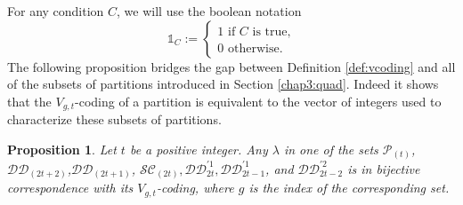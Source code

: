 \documentclass[11pt,letterpaper]{amsart}
\def\ccsc{\mathcal {SC}}
\def\ccdd{\mathcal {DD}}
\def\ccp{\mathcal P}
\newtheorem{prop}[df]{Proposition}		%
\numberwithin{equation}{section}
\numberwithin{df}{section}
\begin{document}
For any condition $C$, we will use the boolean notation
$$\mathds{1}_C:=\begin{cases}
1 \text{ if } C\text{ is true,}\\
0 \text{ otherwise.}\end{cases}$$
The following proposition bridges the gap between Definition \ref{def:vcoding} and all of the subsets of partitions introduced in Section \ref{chap3:quad}. Indeed it shows that the $V_{g,t}$-coding of a partition is equivalent to the vector of integers used to characterize these subsets of partitions.
\begin{prop}\label{prop:core_vcoding}
Let $t$ be a positive integer. Any $\lambda$ in one of the sets $\ccp_{(t)}$, $\ccdd_{(2t+2)}$,$\ccdd_{(2t+1)}$, $\ccsc_{(2t)},\ccdd_{2t}^{'1},\ccdd_{2t-1}^{'1}$, and $\ccdd_{2t-2}^{'2}$ is in bijective correspondence with its $V_{g,t}$-coding, where $g$ is the index of the corresponding set.
\end{prop}

\end{document}
